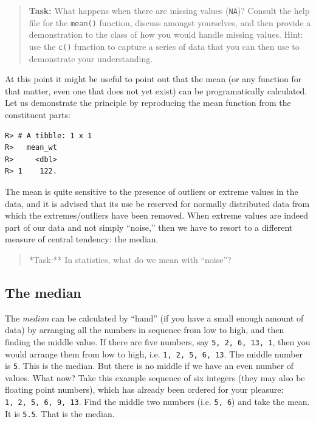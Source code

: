 \documentclass[english,10pt,a4paper,oneside]{book}
\newenvironment{Shaded}{\begin{snugshade}}{\end{snugshade}}
\newcommand{\DataTypeTok}[1]{\textcolor[rgb]{0.13,0.29,0.53}{#1}}
\newcommand{\KeywordTok}[1]{\textcolor[rgb]{0.13,0.29,0.53}{\textbf{#1}}}
\newcommand{\NormalTok}[1]{#1}
\newcommand{\OperatorTok}[1]{\textcolor[rgb]{0.81,0.36,0.00}{\textbf{#1}}}
\newcommand{\StringTok}[1]{\textcolor[rgb]{0.31,0.60,0.02}{#1}}
\theoremstyle{definition}
\theoremstyle{definition}
\theoremstyle{definition}
\theoremstyle{remark}
\begin{document}
\begin{quote}
\textbf{Task:} What happens when there are missing values (\texttt{NA})?
Consult the help file for the \texttt{mean()} function, discuss amongst
yourselves, and then provide a demonstration to the class of how you
would handle missing values. Hint: use the \texttt{c()} function to
capture a series of data that you can then use to demonstrate your
understanding.
\end{quote}

At this point it might be useful to point out that the mean (or any
function for that matter, even one that does not yet exist) can be
programatically calculated. Let us demonstrate the principle by
reproducing the mean function from the constituent parts:

\begin{Shaded}
\end{Shaded}

\begin{verbatim}
R> # A tibble: 1 x 1
R>   mean_wt
R>     <dbl>
R> 1    122.
\end{verbatim}

The mean is quite sensitive to the presence of outliers or extreme
values in the data, and it is advised that its use be reserved for
normally distributed data from which the extremes/outliers have been
removed. When extreme values are indeed part of our data and not simply
\enquote{noise,} then we have to resort to a different measure of
central tendency: the median.

\begin{quote}
*Task:** In statistics, what do we mean with \enquote{noise}?
\end{quote}

\hypertarget{the-median}{%
\subsection{The median}\label{the-median}}

The \emph{median} can be calculated by \enquote{hand} (if you have a
small enough amount of data) by arranging all the numbers in sequence
from low to high, and then finding the middle value. If there are five
numbers, say \texttt{5,\ 2,\ 6,\ 13,\ 1}, then you would arrange them
from low to high, i.e. \texttt{1,\ 2,\ 5,\ 6,\ 13}. The middle number is
\texttt{5}. This is the median. But there is no middle if we have an
even number of values. What now? Take this example sequence of six
integers (they may also be floating point numbers), which has already
been ordered for your pleasure: \texttt{1,\ 2,\ 5,\ 6,\ 9,\ 13}. Find
the middle two numbers (i.e. \texttt{5,\ 6}) and take the mean. It is
\texttt{5.5}. That is the median.
\end{document}
